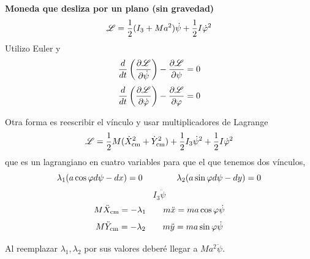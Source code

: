 \documentclass[10pt,oneside]{CBFT_book}
\begin{document}
\begin{ejemplo}{\bf Moneda que desliza por un plano (sin gravedad)}
\[
	\mathscr{L} = \frac 1 2 ( I_3 + Ma^2 ) \dot{\psi} + \frac 1 2 I \dot{\varphi}^2
\]
Utilizo Euler y
\[
	\frac{d^{\hspace{-0.05em}} {}}{d {t}^{\hspace{-0.05em}}}\left( \frac{\partial^{\hspace{-0.05em}} {\mathscr{L}}}{\partial {\dot{\psi}}^{\hspace{-0.05em}}} \right) - \frac{\partial^{\hspace{-0.05em}} {\mathscr{L}}}{\partial {\psi}^{\hspace{-0.05em}}} = 0
\]
\[
	\frac{d^{\hspace{-0.05em}} {}}{d {t}^{\hspace{-0.05em}}}\left( \frac{\partial^{\hspace{-0.05em}} {\mathscr{L}}}{\partial {\dot{\varphi}}^{\hspace{-0.05em}}} \right) - \frac{\partial^{\hspace{-0.05em}} {\mathscr{L}}}{\partial {\varphi}^{\hspace{-0.05em}}} = 0
\]

Otra forma es reescribir el vínculo y usar multiplicadores de Lagrange
\[
	\mathscr{L} = \frac 1 2 M ( \dot{X}^2_\text{cm} + \dot{Y}^2_\text{cm} ) + \frac 1 2 I_3 \dot{\psi}^2 + \frac 1 2 I \dot{\varphi}^2
\]
que es un lagrangiano en cuatro variables para que el que tenemos dos vínculos,
\[
	\lambda_1( a\cos\varphi d\psi - dx) = 0 \qquad \qquad  
	\lambda_2( a\sin\varphi d\psi - dy) = 0
\]
\[
	I_3 \ddot{\psi}  
\]
\[
	M \ddot{X}_\text{cm} = - \lambda_1 \qquad m \ddot{x} = m a \cos \varphi \dot{\psi}
\]
\[
	M \ddot{Y}_\text{cm} = - \lambda_2 \qquad m \ddot{y} = m a \sin \varphi \dot{\psi}
\]

Al reemplazar $\lambda_1, \lambda_2$ por sus valores deberé llegar a $M a^2 \ddot{\psi}$.


\end{ejemplo}





\end{document}
